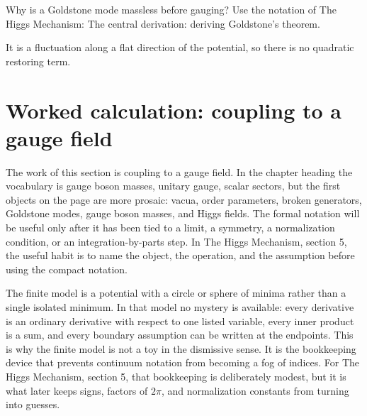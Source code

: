 \begin{exercise}
Why is a Goldstone mode massless before gauging?  Use the notation of The Higgs Mechanism: The central derivation: deriving Goldstone's theorem.
\begin{answer}
It is a fluctuation along a flat direction of the potential, so there is no quadratic restoring term.
\end{answer}
\end{exercise}



\section{Worked calculation: coupling to a gauge field}













The work of this section is coupling to a gauge field.  In the chapter heading the vocabulary is gauge boson masses, unitary gauge, scalar sectors, but the first objects on the page are more prosaic: vacua, order parameters, broken generators, Goldstone modes, gauge boson masses, and Higgs fields.  The formal notation will be useful only after it has been tied to a limit, a symmetry, a normalization condition, or an integration-by-parts step.  In The Higgs Mechanism, section 5, the useful habit is to name the object, the operation, and the assumption before using the compact notation.

The finite model is a potential with a circle or sphere of minima rather than a single isolated minimum.  In that model no mystery is available: every derivative is an ordinary derivative with respect to one listed variable, every inner product is a sum, and every boundary assumption can be written at the endpoints.  This is why the finite model is not a toy in the dismissive sense.  It is the bookkeeping device that prevents continuum notation from becoming a fog of indices.  For The Higgs Mechanism, section 5, that bookkeeping is deliberately modest, but it is what later keeps signs, factors of \(2\pi\), and normalization constants from turning into guesses.

